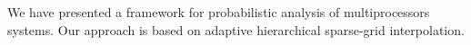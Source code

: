 We have presented a framework for probabilistic analysis of multiprocessors
systems. Our approach is based on adaptive hierarchical sparse-grid
interpolation.
